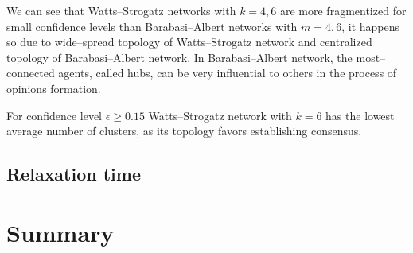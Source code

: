 \documentclass{article}
\begin{document}
We can see that Watts--Strogatz networks with $k=4,6$ are more fragmentized for small confidence levels than Barabasi--Albert networks with $m=4,6$, it happens so due to wide--spread topology of Watts--Strogatz network and centralized topology of Barabasi--Albert network. In Barabasi--Albert network, the most--connected agents, called hubs, can be very influential to others in the process of opinions formation.
\indent

For confidence level $\epsilon \geq 0.15$ Watts--Strogatz network with $k=6$ has the lowest average number of clusters, as its topology favors establishing consensus.

\subsection{Relaxation time}

\section{Summary}
\indent
\end{document}
